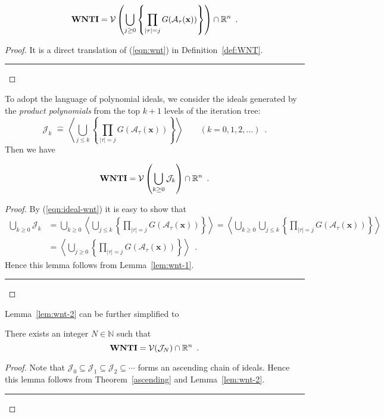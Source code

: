 \documentclass{jssc}
\newcommand{\rulex}{\hfill\rule{1mm}{3mm}}
\newcommand{\A}{\mathcal{A}}
\newcommand{\J}{\mathcal{J}}
\newcommand{\V}{\mathcal{V}}
\newcommand{\define}{\hat{=}}
\newcommand{\xx}{\mathbf{x}}
\newcommand{\WNTI}{{\bf WNTI}}
\begin{document}
\begin{lemma}\label{lem:wnt-1}
\[
\WNTI=\V\left(\bigcup_{j \geq 0} \left\{\prod_{|\tau|=j} G(\A_{\tau}(\xx)) \right\} \right) \cap \mathbb{R}^n \enspace .
\]
\end{lemma}
\begin{proof}
It is a direct translation of (\ref{eqn:wnt}) in Definition~\ref{def:WNT}. \rulex
\end{proof}

To adopt the language of polynomial ideals, we consider the ideals generated by the \emph{product polynomials} from the top $k+1$ levels of the iteration tree:
\begin{equation}\label{eqn:ideal-wnt}
\J_k\,\,\define\,\left\langle \bigcup_{j \leq k} \left\{ \prod_{|\tau|=j} G(\A_{\tau}(\xx)) \right\} \right\rangle \qquad (k=0,1,2,\ldots) \enspace .
\end{equation}
Then we have
\begin{lemma}\label{lem:wnt-2}
\[
\WNTI=\V\left(\bigcup_{k \geq 0} \J_k \right) \cap \mathbb{R}^n \enspace .
\]
\end{lemma}
\begin{proof}
By (\ref{eqn:ideal-wnt}) it is easy to show that
\[
\begin{array}{ll}
\bigcup\limits_{k \geq 0} \J_k & = \bigcup\limits_{k \geq 0} \left\langle \bigcup\limits_{j \leq k} \left\{ \prod\limits_{|\tau|=j} G(\A_{\tau}(\xx)) \right\} \right\rangle = \left\langle \bigcup\limits_{k \geq 0} \bigcup\limits_{j \leq k} \left\{ \prod\limits_{|\tau|=j} G(\A_{\tau}(\xx)) \right\} \right\rangle \\
& = \left\langle \bigcup\limits_{j \geq 0} \left\{ \prod\limits_{|\tau|=j} G(\A_{\tau}(\xx)) \right\} \right\rangle \enspace .
\end{array}
\]
Hence this lemma follows from Lemma~\ref{lem:wnt-1}. \rulex
\end{proof}

Lemma~\ref{lem:wnt-2} can be further simplified to
\begin{lemma}\label{lem:wnt-3}
There exists an integer $N \in \mathbb{N}$ such that
\[
\WNTI=\V(\J_N) \cap \mathbb{R}^n \enspace .
\]
\end{lemma}
\begin{proof}
Note that $\J_0 \subseteq \J_1 \subseteq \J_2 \subseteq \cdots$ forms an ascending chain of ideals. Hence this lemma follows from Theorem~\ref{ascending} and Lemma~\ref{lem:wnt-2}. \rulex
\end{proof}
\end{document}
